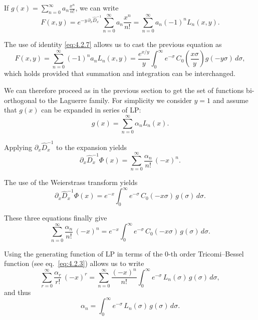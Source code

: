 If $g(x) = \sum_{n=0}^{\infty} a_n \frac{x^n}{n!}$, we can write
\begin{equation}
F(x,y) = e^{-y\,\partial_x \hat D_x^{-1}}
\sum_{n=0}^{\infty} a_n \frac{x^n}{n!}
= \sum_{n=0}^{\infty} a_n (-1)^n L_n(x,y).
\label{eq:4.3.4}
\end{equation}

The use of identity \eqref{eq:4.2.7} allows us to cast the previous
equation as
\begin{equation}
F(x,y) = \sum_{n=0}^{\infty} (-1)^n a_n L_n(x,y)
= \frac{e^{x/y}}{y}\int_0^{\infty} e^{-\sigma}\,
C_0\!\left(\frac{x\sigma}{y}\right) g(-y\sigma)\,d\sigma,
\label{eq:4.3.5}
\end{equation}
which holds provided that summation and integration can be interchanged.

We can therefore proceed as in the previous section to get the set of
functions bi-orthogonal to the Laguerre family. For simplicity we consider
$y=1$ and assume that $g(x)$ can be expanded in series of LP:
\begin{equation}
g(x) = \sum_{n=0}^{\infty} \alpha_n L_n(x).
\label{eq:4.3.6}
\end{equation}

Applying $\partial_x \hat D_x^{-1}$ to the expansion yields
\begin{equation}
\partial_x \hat D_x^{-1} \Phi(x)
= \sum_{n=0}^{\infty} \frac{\alpha_n}{n!}\,(-x)^n.
\label{eq:4.3.7}
\end{equation}

The use of the Weierstrass transform yields
\begin{equation}
\partial_x \hat D_x^{-1} \Phi(x)
= e^{-x}\int_0^{\infty} e^{-\sigma}\,C_0(-x\sigma)\,g(\sigma)\,d\sigma.
\label{eq:4.3.8}
\end{equation}

These three equations finally give
\begin{equation}
\sum_{n=0}^{\infty} \frac{\alpha_n}{n!}\,(-x)^n
= e^{-x}\int_0^{\infty} e^{-\sigma}\,C_0(-x\sigma)\,g(\sigma)\,d\sigma.
\label{eq:4.3.9}
\end{equation}

Using the generating function of LP in terms of the 0-th order
Tricomi--Bessel function (see eq.~\eqref{eq:4.2.3}) allows us to write
\begin{equation}
\sum_{r=0}^{\infty} \frac{\alpha_r}{r!}\,(-x)^r
= \sum_{n=0}^{\infty} \frac{(-x)^n}{n!}
\int_0^{\infty} e^{-\sigma}\,L_n(\sigma)\,g(\sigma)\,d\sigma,
\label{eq:4.3.10}
\end{equation}
and thus
\begin{equation}
\alpha_n = \int_0^{\infty} e^{-\sigma}\,L_n(\sigma)\,g(\sigma)\,d\sigma.
\label{eq:4.3.11}
\end{equation}

